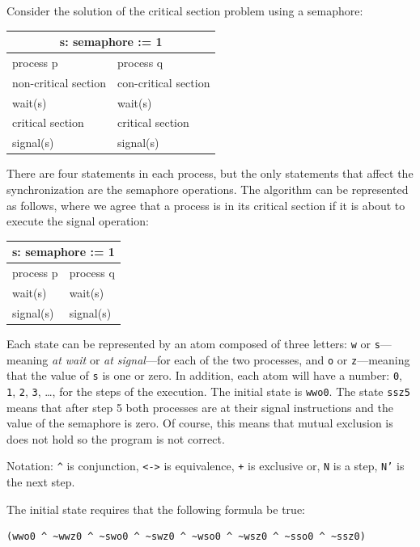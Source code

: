\documentclass[11pt]{report}
\newcommand*{\p}[1]{\textup{\texttt{#1}}}
\begin{document}
Consider the solution of the critical section problem using a semaphore:

\begin{center}
\begin{tabular}{|l|l|}
\hline
\multicolumn{2}{|c|}{s: semaphore := 1}\\\hline
process p & process q\\\hline
non-critical section & con-critical section \\
wait(s) & wait(s) \\
critical section & critical section \\
signal(s) & signal(s)\\\hline
\end{tabular}
\end{center}

There are four statements in each process, but the only statements that
affect the synchronization are the semaphore operations. The algorithm
can be represented as follows, where we agree that a process is in its
critical section if it is about to execute the signal operation:

\begin{center}
\begin{tabular}{|l|l|}
\hline
\multicolumn{2}{|c|}{s: semaphore := 1}\\\hline
process p & process q\\\hline
wait(s) & wait(s) \\
signal(s) & signal(s)\\\hline
\end{tabular}
\end{center}

Each state can be represented by an atom composed of three letters:
\p{w} or \p{s}---meaning \emph{at wait} or \emph{at signal}---for each
of the two processes, and \p{o} or \p{z}---meaning that the value of
\p{s} is one or zero. In addition, each atom will have a number: \p{0},
\p{1}, \p{2}, \p{3}, \ldots, for the steps of the execution. The initial
state is \p{wwo0}. The state \p{ssz5} means that after step 5 both
processes are at their signal instructions and the value of the
semaphore is zero. Of course, this means that mutual exclusion is does
not hold so the program is not correct.

Notation: \verb=^= is conjunction, \verb=<->= is equivalence, \verb=+= is
exclusive or, \p{N} is a step, \p{N'} is the next step.

The initial state requires that the following formula be true:
\begin{verbatim}
(wwo0 ^ ~wwz0 ^ ~swo0 ^ ~swz0 ^ ~wso0 ^ ~wsz0 ^ ~sso0 ^ ~ssz0)
\end{verbatim}
\end{document}
